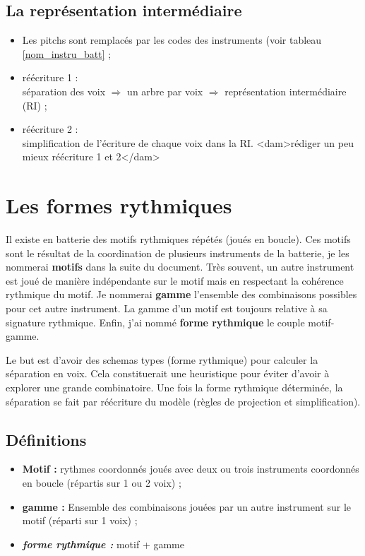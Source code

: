 \subsection*{La représentation intermédiaire}
\begin{itemize}
    \item Les pitchs sont remplacés par les codes des instruments (voir tableau
    \ref{nom_instru_batt} ;
    \item réécriture 1 :\\
    séparation des voix $\Rightarrow$ un arbre par voix
    $\Rightarrow$ représentation intermédiaire (RI) ;
    \item réécriture 2 :\\
    simplification de l’écriture de chaque voix dans la RI.
    <dam>rédiger un peu mieux réécriture 1 et 2</dam>
\end{itemize}

\section{Les formes rythmiques}
\label{systemes_methodes}
Il existe en batterie des motifs rythmiques répétés (joués en boucle). Ces
motifs sont le résultat de la coordination de plusieurs instruments de la
batterie, je les nommerai \textbf{motifs} dans la suite du document. Très
souvent, un autre instrument est joué de manière indépendante sur le motif mais
en respectant la cohérence rythmique du motif. Je nommerai \textbf{gamme}
l’ensemble des combinaisons possibles pour cet autre instrument. La gamme d’un
motif est toujours relative à sa signature rythmique. Enfin, j’ai nommé
\textbf{forme rythmique} le couple motif-gamme.

Le but est d'avoir des schemas types (forme rythmique) pour calculer la
séparation en voix. Cela constituerait une heuristique pour éviter d'avoir à
explorer une grande combinatoire. Une fois la forme rythmique déterminée, la
séparation se fait par réécriture du modèle (règles de projection et
simplification).

\subsection*{Définitions}

\begin{itemize}
    \item \textbf{Motif :} rythmes coordonnés joués avec deux ou trois
        instruments coordonnés en boucle (répartis sur 1 ou 2 voix) ;
    \item \textbf{gamme :} Ensemble des combinaisons jouées par un autre
        instrument sur le motif (réparti sur 1 voix) ;
    \item \textit{\textbf{forme rythmique :}} motif + gamme
\end{itemize}

